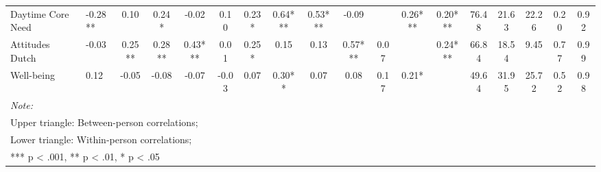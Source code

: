 \begin{sidewaystable}
{\begin{tabular}[t]{llcccccccccccccccc}
Daytime Core Need & -0.28** & 0.10 & 0.24* & -0.02 & 0.10 & 0.23* & 0.64*** & 0.53*** & -0.09 &  & 0.26*** & 0.20*** & 76.48 & 21.63 & 22.26 & 0.20 & 0.92\\
\addlinespace
Attitudes Dutch & -0.03 & 0.25** & 0.28** & 0.43*** & 0.01 & 0.25* & 0.15 & 0.13 & 0.57*** & 0.07 &  & 0.24*** & 66.84 & 18.54 & 9.45 & 0.77 & 0.99\\
Well-being & 0.12 & -0.05 & -0.08 & -0.07 & -0.03 & 0.07 & 0.30** & 0.07 & 0.08 & 0.17 & 0.21* &  & 49.64 & 31.95 & 25.72 & 0.52 & 0.98\\
\bottomrule
\multicolumn{18}{l}{\rule{0pt}{1em}\textit{Note: }}\\
\multicolumn{18}{l}{\rule{0pt}{1em}Upper triangle: Between-person correlations;}\\
\multicolumn{18}{l}{\rule{0pt}{1em}Lower triangle: Within-person correlations;}\\
\multicolumn{18}{l}{\rule{0pt}{1em}*** p < .001, ** p < .01,  * p < .05}\\
\end{tabular}}
\end{sidewaystable}
